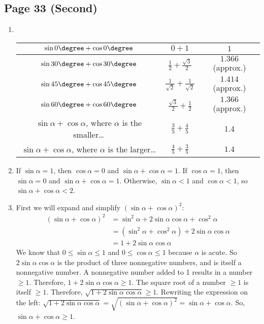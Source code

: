 \documentclass{article}
\newenvironment{solutions}[1]
{\subsection*{#1}
 \begin{enumerate}[leftmargin=1.5em]}
{\end{enumerate}}
\newcommand{\solution}{\item}
\begin{document}
\begin{solutions}{Page 33 (Second)}
\solution ~%
\begin{center}
\bgroup
\def\arraystretch{2}
\setlength\tabcolsep{15pt}
\begin{tabular}{ |c|c|c| }
\hline
$\sin{0\degree} + \cos{0\degree}$ & $0 + 1$        & $1$ \\
\hline
$\sin{30\degree} + \cos{30\degree}$ & $\frac{1}{2} + \frac{\sqrt{3}}{2}$        & $1.366$ (approx.) \\
\hline
$\sin{45\degree} + \cos{45\degree}$ & $\frac{1}{\sqrt{2}} + \frac{1}{\sqrt{2}}$ & $1.414$ (approx.) \\
\hline
$\sin{60\degree} + \cos{60\degree}$ & $\frac{\sqrt{3}}{2} + \frac{1}{2}$        & $1.366$ (approx.) \\
\hline
\makecell{$\sin{\alpha} + \cos{\alpha}$, where $\alpha$\\ is the smaller\ldots} & $\frac{3}{5} + \frac{4}{5}$ & $1.4$ \\
\hline
\makecell{$\sin{\alpha} + \cos{\alpha}$, where $\alpha$\\ is the larger\ldots}  & $ \frac{4}{5} + \frac{3}{5}$ & $1.4$ \\
\hline
\end{tabular}
\egroup
\end{center}

\solution %
If $\sin{\alpha} = 1$, then $\cos{\alpha} = 0$ and $\sin{\alpha} + \cos{\alpha} = 1$.
If $\cos{\alpha} = 1$, then $\sin{\alpha} = 0$ and $\sin{\alpha} + \cos{\alpha} = 1$.
Otherwise, $\sin{\alpha} < 1$ and $\cos{\alpha} < 1$, so $\sin{\alpha} + \cos{\alpha} < 2$.

\solution %
First we will expand and simplify $(\sin{\alpha} + \cos{\alpha})^2$:
\begin{align*}
(\sin{\alpha} + \cos{\alpha})^2 &= \sin^{2}{\alpha} + 2\sin{\alpha}\cos{\alpha} + \cos^{2}{\alpha} \\
&= (\sin^{2}{\alpha} + \cos^{2}{\alpha}) + 2\sin{\alpha}\cos{\alpha} \\
&= 1 + 2\sin{\alpha}\cos{\alpha}
\end{align*}
We know that $0 \leq \sin{\alpha} \leq 1$ and $0 \leq \cos{\alpha} \leq 1$ because $\alpha$ is acute.
So $2\sin{\alpha}\cos{\alpha}$ is the product of three nonnegative numbers, and is itself a nonnegative number.
A nonnegative number added to 1 results in a number $\geq 1$.
Therefore, $1 + 2\sin{\alpha}\cos{\alpha} \geq 1$.
The square root of a number $\geq 1$ is itself $\geq 1$.
Therefore, $\sqrt{1 + 2\sin{\alpha}\cos{\alpha}} \geq 1$.
Rewriting the expression on the left: $\sqrt{1 + 2\sin{\alpha}\cos{\alpha}} = \sqrt{(\sin{\alpha} + \cos{\alpha})^2} = \sin{\alpha} + \cos{\alpha}$.
So, $\sin{\alpha} + \cos{\alpha} \geq 1$.


\end{solutions}
\end{document}
